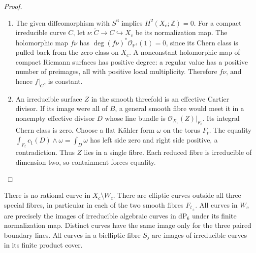 \begin{proof}
\begin{enumerate}[label=\arabic*.,leftmargin=*]
\item The given diffeomorphism with \(S^6\) implies \(H^2(X_c;\mathbb Z)=0\).
For a compact irreducible curve \(C\), let
\(\nu:\widetilde C\to C\hookrightarrow X_c\) be its normalization map.
The holomorphic map \(f\nu\) has
\(\deg (f\nu)^*\mathcal O_{\mathbb P^1}(1)=0\), since its Chern class is
pulled back from the zero class on \(X_c\). A nonconstant holomorphic map
of compact Riemann surfaces has positive degree: a regular value has a
positive number of preimages, all with positive local multiplicity.
Therefore \(f\nu\), and hence \(f|_C\), is constant.

\item An irreducible surface \(Z\) in the smooth threefold is an effective
Cartier divisor. If its image were all of \(B\), a general smooth fibre
would meet it in a nonempty effective divisor \(D\) whose line bundle
is \(\mathcal O_{X_c}(Z)|_{F_t}\). Its integral Chern class is zero.
Choose a flat K\"ahler form \(\omega\) on the torus \(F_t\). The equality
\(\int_{F_t}c_1(D)\wedge\omega=\int_D\omega\) has left side zero and right
side positive, a contradiction. Thus \(Z\) lies in a single fibre.
Each reduced fibre is irreducible of dimension two, so containment forces
equality.
\end{enumerate}
\end{proof}

\begin{proposition}\hypertarget{tag-01QZ}{}\label{fam:src:D.2.2}\label{fam:st:D.2.2}

There is no rational curve in \(X_c\setminus W_c\). There are elliptic
curves outside all three special fibres, in particular in each of the
two smooth fibres \(F_{t_\pm}\). All curves in \(W_c\) are precisely the
images of irreducible algebraic curves in \(\mathrm{dP}_6\) under its
finite normalization map. Distinct curves have the same image only for
the three paired boundary lines. All curves in a bielliptic fibre
\(S_j\) are images of irreducible curves in its finite product cover.
\end{proposition}


